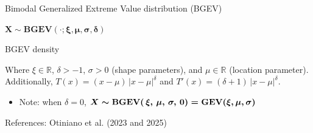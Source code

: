 \begin{frame}{Bimodal Generalized Extreme Value distribution (BGEV)}

\vspace*{0.45cm}
$\boldsymbol{X \sim \mathbf{BGEV}(\cdot;\xi,\mu,\sigma,\delta)}$

\vspace*{0.3cm}
\begin{block}{BGEV density}
\end{block}

\vspace*{0.5cm}

Where $\xi \in \mathbb{R}$, $\delta > -1$, $\sigma > 0$ (shape parameters), and $\mu \in \mathbb{R}$ (location parameter). Additionally, $T(x) = (x - \mu)\, |x - \mu|^{\delta}$ and $T'(x) = (\delta + 1)\, |x - \mu|^{\delta}$.

\vspace*{0.25cm}
\begin{itemize}
\item Note: when $\delta = 0$, $\boldsymbol{X \sim \text{\textbf{BGEV}}(\, \xi, \, \mu, \, \sigma, \, 0) = \text{\textbf{GEV}}(\xi, \mu, \sigma)}$
\end{itemize}

\vfill
\begin{flushright}
{\tiny References: Otiniano et al. (2023 and 2025)}
\end{flushright}

\end{frame}


